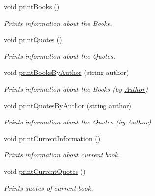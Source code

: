 \begin{DoxyCompactItemize}
void \hyperlink{class_library_a35220a3b5a4a6d9059cc4fc18ae4c0c3}{print\+Books} ()
\begin{DoxyCompactList}\small\item\em Prints information about the Books. \end{DoxyCompactList}\item 
void \hyperlink{class_library_a819acb04f4b8aea0547db50918b1c5fa}{print\+Quotes} ()
\begin{DoxyCompactList}\small\item\em Prints information about the Quotes. \end{DoxyCompactList}\item 
void \hyperlink{class_library_a6e22621933979ff5cb4e95de3f54b72c}{print\+Books\+By\+Author} (string author)
\begin{DoxyCompactList}\small\item\em Prints information about the Books (by \hyperlink{class_author}{Author}) \end{DoxyCompactList}\item 
void \hyperlink{class_library_aa13544bfe57c61164d9953518e88dcb0}{print\+Quotes\+By\+Author} (string author)
\begin{DoxyCompactList}\small\item\em Prints information about the Quotes (by \hyperlink{class_author}{Author}) \end{DoxyCompactList}\item 
void \hyperlink{class_library_a449a2d686922007674fa4a5efff89fe7}{print\+Current\+Information} ()
\begin{DoxyCompactList}\small\item\em Prints information about current book. \end{DoxyCompactList}\item 
void \hyperlink{class_library_a7be02d15c840e3d1c3ec998e204f7bf9}{print\+Current\+Quotes} ()
\begin{DoxyCompactList}\small\item\em Prints quotes of current book. \end{DoxyCompactList}\end{DoxyCompactItemize}
